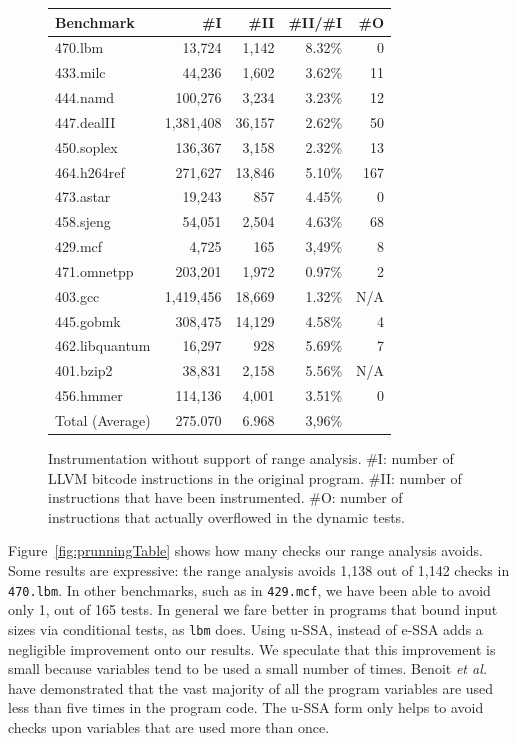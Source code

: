 \documentclass{sigplanconf}[10pt]
\begin{document}
\begin{figure}[htb]
\begin{center}
\begin{small}
\begin{tabular*}{\columnwidth}{@{\extracolsep{\fill}}|l|r|r|r|r|}
\hline
Benchmark & \#I & \#II & \#II/\#I & \#O \\ \hline
470.lbm & 13,724 & 1,142 & 8.32\% & 0 \\ \hline
433.milc & 44,236 & 1,602 & 3.62\% & 11 \\ \hline
444.namd & 100,276 & 3,234 & 3.23\% & 12 \\ \hline
447.dealII & 1,381,408 & 36,157 & 2.62\% & 50 \\ \hline
450.soplex & 136,367 & 3,158 & 2.32\% & 13 \\ \hline
464.h264ref & 271,627 & 13,846 & 5.10\% & 167 \\ \hline
473.astar & 19,243 & 857 & 4.45\% & 0 \\ \hline
458.sjeng & 54,051 & 2,504 & 4.63\% & 68 \\ \hline
429.mcf & 4,725 & 165 & 3,49\% & 8 \\ \hline
471.omnetpp & 203,201 & 1,972 & 0.97\% & 2 \\ \hline
403.gcc & 1,419,456 & 18,669 & 1.32\% & N/A \\ \hline
445.gobmk & 308,475 & 14,129 & 4.58\% & 4 \\ \hline
462.libquantum & 16,297 & 928 & 5.69\% & 7 \\ \hline
401.bzip2 & 38,831 & 2,158 & 5.56\% & N/A \\ \hline
456.hmmer & 114,136 & 4,001 & 3.51\% & 0 \\ \hline
\multicolumn{1}{|r|}{Total (Average)} & 275.070 & 6.968 & 3,96\% &  \\ \hline
\end{tabular*}
\end{small}
\end{center}
\caption{\label{fig:unprunedTable}
Instrumentation without support of range analysis.
\#I: number of LLVM bitcode instructions in the original program.
\#II: number of instructions that have been instrumented.
\#O: number of instructions that actually overflowed in the dynamic tests.}
\end{figure}

Figure~\ref{fig:prunningTable} shows how many checks our range analysis
avoids.
Some results are expressive: the range analysis avoids 1,138 out of 1,142 checks in
\texttt{470.lbm}.
In other benchmarks, such as in \texttt{429.mcf}, we have been able to
avoid only 1, out of 165 tests.
In general we fare better in programs that bound input sizes via conditional
tests, as \texttt{lbm} does.
Using u-SSA, instead of e-SSA adds a negligible improvement onto our results.
We speculate that this improvement is small because variables tend to be used
a small number of times.
Benoit {\em et al.}~\cite{Benoit08} have demonstrated that the vast majority
of all the program variables are used less than five times in the program
code.
The u-SSA form only helps to avoid checks upon variables that are used more
than once.
\end{document}
